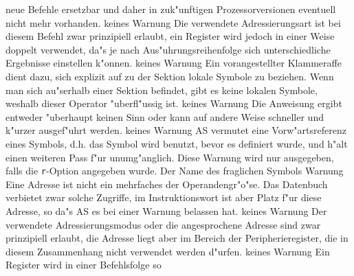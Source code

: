 \documentclass[12pt,a4paper,twoside]{report}
\newcommand{\tty}[1]{{\tt #1}}
\begin{document}
\begin{description}
{                neue Befehle ersetzbar und daher in zuk"unftigen
                Prozessorversionen eventuell nicht mehr vorhanden.}
               {keines}
               {Warnung}
               {Die verwendete Adressierungsart ist bei
                diesem Befehl zwar prinzipiell erlaubt, ein Register
                wird jedoch in einer Weise doppelt verwendet, da"s je
                nach Aus"uhrungsreihenfolge sich unterschiedliche
                Ergebnisse einstellen k"onnen.}
               {keines}
               {Warnung}
               {Ein vorangestellter Klammeraffe dient
                dazu, sich explizit auf zu der Sektion lokale Symbole
                zu beziehen.  Wenn man sich au"serhalb einer Sektion
                befindet, gibt es keine lokalen Symbole, weshalb dieser
                Operator "uberfl"ussig ist.}
               {keines}
               {Warnung}
               {Die Anweisung ergibt entweder "uberhaupt
                keinen Sinn oder kann auf andere Weise schneller und k"urzer
                ausgef"uhrt werden.}
               {keines}
               {Warnung}
               {AS vermutet eine Vorw"artsreferenz eines
                Symbols, d.h. das Symbol wird benutzt, bevor es definiert
                wurde, und h"alt einen weiteren Pass f"ur unumg"anglich.
                Diese Warnung wird nur ausgegeben, falls die \tty{r}-Option
                angegeben wurde.}
               {Der Name des fraglichen Symbols}
               {Warnung}
               {Eine Adresse ist nicht ein mehrfaches der
                Operandengr"o"se.  Das Datenbuch verbietet zwar solche Zugriffe,
                im Instruktionswort ist aber Platz f"ur diese Adresse, so da"s
                AS es bei einer Warnung belassen hat.}
               {keines}
               {Warnung}
               {Der verwendete Adressierungsmodus oder die
                angesprochene Adresse sind zwar prinzipiell erlaubt, die
                Adresse liegt aber im Bereich der Peripherieregister, die in
                diesem Zusammenhang nicht verwendet werden d"urfen.}
               {keines}
               {Warnung}
               {Ein Register wird in einer Befehlsfolge so
}
\end{description}
\end{document}
